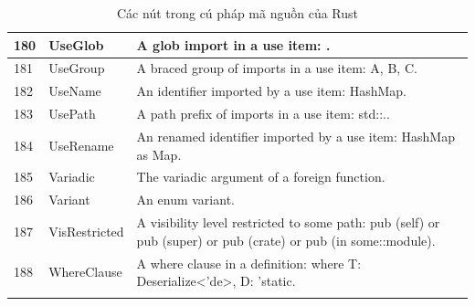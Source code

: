\begin{longtable}{| p{} | p{} | p{} |}
180   & UseGlob                        & A glob import in a use item: \*.                                                                               \\ \hline
181   & UseGroup                       & A braced group of imports in a use item: {A, B, C}.                                                            \\ \hline
182   & UseName                        & An identifier imported by a use item: HashMap.                                                                 \\ \hline
183   & UsePath                        & A path prefix of imports in a use item: std::..                                                                \\ \hline
184   & UseRename                      & An renamed identifier imported by a use item: HashMap as Map.                                                  \\ \hline
185   & Variadic                       & The variadic argument of a foreign function.                                                                   \\ \hline
186   & Variant                        & An enum variant.                                                                                               \\ \hline
187   & VisRestricted                  & A visibility level restricted to some path: pub (self) or pub (super) or pub (crate) or pub (in some::module). \\ \hline
188   & WhereClause                    & A where clause in a definition: where T: Deserialize<'de>, D: 'static.                                         \\ \hline
\caption{Các nút trong cú pháp mã nguồn của Rust}
\label{table:method_nodeastrust}
\end{longtable}
\medskip